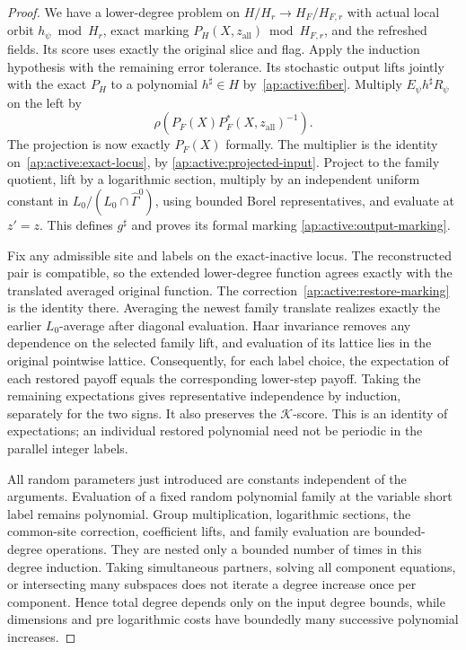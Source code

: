 \begin{proof}
We have a lower-degree problem on
$H/H_r\to H_F/H_{F,r}$ with actual local orbit
$h_\psi\bmod H_r$, exact marking
$P_H(X,z_{\mathrm{all}})\bmod H_{F,r}$, and the refreshed fields.
Its score uses exactly the original slice and flag.  Apply the
induction hypothesis with the remaining error tolerance.
Its stochastic output lifts jointly with the exact $P_H$ to a
polynomial $h^\sharp\in H$ by~\eqref{ap:active:fiber}.  Multiply
$E_\psi h^\sharp R_\psi$ on the left by
\begin{equation}
       \rho\!\left(P_F(X)P_F^*(X,z_{\mathrm{all}})^{-1}\right).
 \label{ap:active:restore-marking}
\end{equation}
The projection is now exactly $P_F(X)$ formally.  The multiplier
is the identity on~\eqref{ap:active:exact-locus}, by
\eqref{ap:active:projected-input}.  Project to the family quotient,
lift by a logarithmic section, multiply by an independent uniform
constant in $L_0/(L_0\cap\widehat\Gamma^0)$, using bounded Borel
representatives, and evaluate at $z'=z$.  This defines
$g^\sharp$ and proves its formal marking
\eqref{ap:active:output-marking}.

Fix any admissible site and labels on the exact-inactive locus.
The reconstructed pair is compatible, so the extended lower-degree
function agrees exactly with the translated averaged original
function.  The correction~\eqref{ap:active:restore-marking} is the
identity there.  Averaging the newest family translate realizes
exactly the earlier $L_0$-average after diagonal evaluation.  Haar
invariance removes any dependence on the selected family lift,
and evaluation of its lattice lies in the original pointwise
lattice.  Consequently, for each label choice, the expectation of
each restored payoff equals the corresponding lower-step payoff.
Taking the remaining expectations gives representative independence
by induction, separately for the two signs.  It also preserves
the $\mathcal K$-score.  This is an identity of expectations;
an individual restored polynomial need not be periodic in the
parallel integer labels.

All random parameters just introduced are constants independent of
the arguments.  Evaluation of a fixed random polynomial family at
the variable short label remains polynomial.  Group multiplication,
logarithmic sections, the common-site correction, coefficient lifts,
and family evaluation are bounded-degree operations.  They are
nested only a bounded number of times in this degree induction.
Taking simultaneous partners, solving all component equations,
or intersecting many subspaces does not iterate a degree increase
once per component.  Hence total degree depends only on the input
degree bounds, while dimensions and pre logarithmic costs have
boundedly many successive polynomial increases.


\end{proof}
